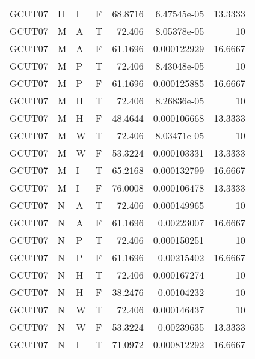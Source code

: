 \begin{longtable}{llllrrr}
    GCUT07   & H         & I         & F          & 68.8716    & 6.47545e-05 & 13.3333  \\
    GCUT07   & M         & A         & T          & 72.406     & 8.05378e-05 & 10       \\
    GCUT07   & M         & A         & F          & 61.1696    & 0.000122929 & 16.6667  \\
    GCUT07   & M         & P         & T          & 72.406     & 8.43048e-05 & 10       \\
    GCUT07   & M         & P         & F          & 61.1696    & 0.000125885 & 16.6667  \\
    GCUT07   & M         & H         & T          & 72.406     & 8.26836e-05 & 10       \\
    GCUT07   & M         & H         & F          & 48.4644    & 0.000106668 & 13.3333  \\
    GCUT07   & M         & W         & T          & 72.406     & 8.03471e-05 & 10       \\
    GCUT07   & M         & W         & F          & 53.3224    & 0.000103331 & 13.3333  \\
    GCUT07   & M         & I         & T          & 65.2168    & 0.000132799 & 16.6667  \\
    GCUT07   & M         & I         & F          & 76.0008    & 0.000106478 & 13.3333  \\
    GCUT07   & N         & A         & T          & 72.406     & 0.000149965 & 10       \\
    GCUT07   & N         & A         & F          & 61.1696    & 0.00223007  & 16.6667  \\
    GCUT07   & N         & P         & T          & 72.406     & 0.000150251 & 10       \\
    GCUT07   & N         & P         & F          & 61.1696    & 0.00215402  & 16.6667  \\
    GCUT07   & N         & H         & T          & 72.406     & 0.000167274 & 10       \\
    GCUT07   & N         & H         & F          & 38.2476    & 0.00104232  & 10       \\
    GCUT07   & N         & W         & T          & 72.406     & 0.000146437 & 10       \\
    GCUT07   & N         & W         & F          & 53.3224    & 0.00239635  & 13.3333  \\
    GCUT07   & N         & I         & T          & 71.0972    & 0.000812292 & 16.6667  \\

\end{longtable}
